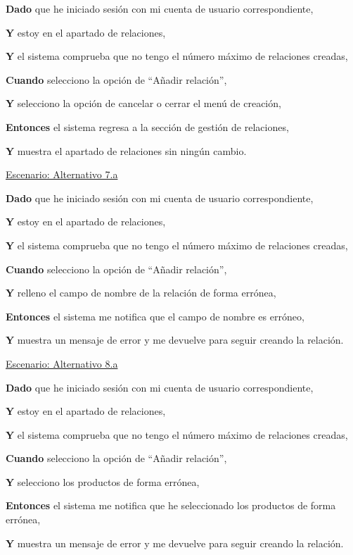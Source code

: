 \textbf{Dado} que he iniciado sesión con mi cuenta de usuario correspondiente,\par
\textbf{Y} estoy en el apartado de relaciones,\par
\textbf{Y} el sistema comprueba que no tengo el número máximo de relaciones creadas,\par
\textbf{Cuando} selecciono la opción de \enquote{Añadir relación},\par
\textbf{Y} selecciono la opción de cancelar o cerrar el menú de creación,\par
\textbf{Entonces} el sistema regresa a la sección de gestión de relaciones,\par
\textbf{Y} muestra el apartado de relaciones sin ningún cambio.\par

\vspace{0.20cm}

\underline{Escenario: Alternativo 7.a}\par
\vspace{0.15cm}

\textbf{Dado} que he iniciado sesión con mi cuenta de usuario correspondiente,\par
\textbf{Y} estoy en el apartado de relaciones,\par
\textbf{Y} el sistema comprueba que no tengo el número máximo de relaciones creadas,\par
\textbf{Cuando} selecciono la opción de \enquote{Añadir relación},\par
\textbf{Y} relleno el campo de nombre de la relación de forma errónea,\par
\textbf{Entonces} el sistema me notifica que el campo de nombre es erróneo,\par
\textbf{Y} muestra un mensaje de error y me devuelve para seguir creando la relación.\par

\vspace{0.20cm}

\underline{Escenario: Alternativo 8.a}\par
\vspace{0.15cm}

\textbf{Dado} que he iniciado sesión con mi cuenta de usuario correspondiente,\par
\textbf{Y} estoy en el apartado de relaciones,\par
\textbf{Y} el sistema comprueba que no tengo el número máximo de relaciones creadas,\par
\textbf{Cuando} selecciono la opción de \enquote{Añadir relación},\par
\textbf{Y} selecciono los productos de forma errónea,\par
\textbf{Entonces} el sistema me notifica que he seleccionado los productos de forma errónea,\par
\textbf{Y} muestra un mensaje de error y me devuelve para seguir creando la relación.\par

